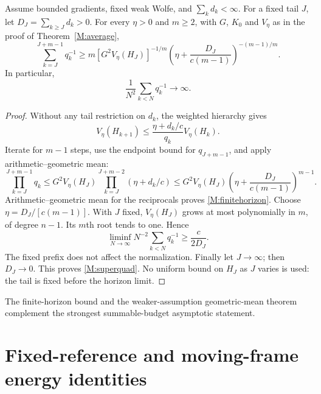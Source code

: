 \begin{theorem}\label{M:superquadratic}
Assume bounded gradients, fixed weak Wolfe, and $\sum_kd_k<\infty$. For a fixed tail $J$, let $D_J=\sum_{k\ge J}d_k>0$. For every $\eta>0$ and $m\ge2$, with $G$, $K_0$ and $V_\eta$ as in the proof of Theorem~\ref{M:average},
\begin{equation}\label{M:finitehorizon}
 \sum_{k=J}^{J+m-1}q_k^{-1}\ge
 m[G^2V_\eta(H_J)]^{-1/m}
 \left(\eta+\frac{D_J}{c(m-1)}\right)^{-(m-1)/m}.
\end{equation}
In particular,
\begin{equation}\label{M:superquad}
 \frac1{N^2}\sum_{k<N}q_k^{-1}\longrightarrow\infty.
\end{equation}
\end{theorem}
\begin{proof}
Without any tail restriction on $d_k$, the weighted hierarchy gives
\[
 V_\eta(H_{k+1})\le\frac{\eta+d_k/c}{q_k}V_\eta(H_k).
\]
Iterate for $m-1$ steps, use the endpoint bound for $q_{J+m-1}$, and apply arithmetic--geometric mean:
\[
 \prod_{k=J}^{J+m-1}q_k
 \le G^2V_\eta(H_J)\prod_{k=J}^{J+m-2}(\eta+d_k/c)
 \le G^2V_\eta(H_J)\left(\eta+\frac{D_J}{c(m-1)}\right)^{m-1}.
\]
Arithmetic--geometric mean for the reciprocals proves \eqref{M:finitehorizon}. Choose $\eta=D_J/[c(m-1)]$. With $J$ fixed, $V_\eta(H_J)$ grows at most polynomially in $m$, of degree $n-1$. Its $m$th root tends to one. Hence
\[
 \liminf_{N\to\infty}N^{-2}\sum_{k<N}q_k^{-1}\ge \frac{c}{2D_J}.
\]
The fixed prefix does not affect the normalization. Finally let $J\to\infty$; then $D_J\to0$. This proves \eqref{M:superquad}. No uniform bound on $H_J$ as $J$ varies is used: the tail is fixed before the horizon limit.
\end{proof}
The finite-horizon bound and the weaker-assumption geometric-mean theorem complement the strongest summable-budget asymptotic statement.



\section{Fixed-reference and moving-frame energy identities}
\label{M:energy}

